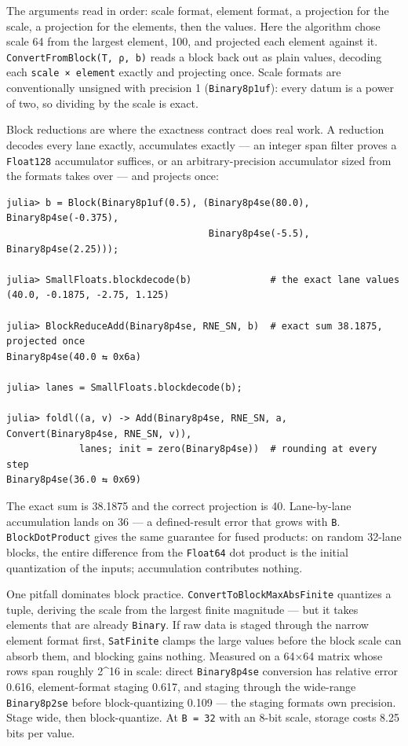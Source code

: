 The arguments read in order: scale format, element format, a projection for the scale, a projection for the elements, then the values. Here the algorithm chose scale 64 from the largest element, 100, and projected each element against it. \texttt{ConvertFromBlock(T, ρ, b)} reads a block back out as plain values, decoding each \texttt{scale × element} exactly and projecting once. Scale formats are conventionally unsigned with precision 1 (\texttt{Binary8p1uf}): every datum is a power of two, so dividing by the scale is exact.



Block reductions are where the exactness contract does real work. A reduction decodes every lane exactly, accumulates exactly — an integer span filter proves a \texttt{Float128} accumulator suffices, or an arbitrary-precision accumulator sized from the formats takes over — and projects once:




\begin{verbatim}
julia> b = Block(Binary8p1uf(0.5), (Binary8p4se(80.0), Binary8p4se(-0.375),
                                    Binary8p4se(-5.5), Binary8p4se(2.25)));

julia> SmallFloats.blockdecode(b)              # the exact lane values
(40.0, -0.1875, -2.75, 1.125)

julia> BlockReduceAdd(Binary8p4se, RNE_SN, b)  # exact sum 38.1875, projected once
Binary8p4se(40.0 ⇆ 0x6a)

julia> lanes = SmallFloats.blockdecode(b);

julia> foldl((a, v) -> Add(Binary8p4se, RNE_SN, a, Convert(Binary8p4se, RNE_SN, v)),
             lanes; init = zero(Binary8p4se))  # rounding at every step
Binary8p4se(36.0 ⇆ 0x69)
\end{verbatim}



The exact sum is 38.1875 and the correct projection is 40. Lane-by-lane accumulation lands on 36 — a defined-result error that grows with \texttt{B}. \texttt{BlockDotProduct} gives the same guarantee for fused products: on random 32-lane blocks, the entire difference from the \texttt{Float64} dot product is the initial quantization of the inputs; accumulation contributes nothing.



One pitfall dominates block practice. \texttt{ConvertToBlockMaxAbsFinite} quantizes a tuple, deriving the scale from the largest finite magnitude — but it takes elements that are already \texttt{Binary}. If raw data is staged through the narrow element format first, \texttt{SatFinite} clamps the large values before the block scale can absorb them, and blocking gains nothing. Measured on a 64×64 matrix whose rows span roughly 2{\textasciicircum}16 in scale: direct \texttt{Binary8p4se} conversion has relative error 0.616, element-format staging 0.617, and staging through the wide-range \texttt{Binary8p2se} before block-quantizing 0.109 — the staging format{\textquotesingle}s own precision. Stage wide, then block-quantize. At \texttt{B = 32} with an 8-bit scale, storage costs 8.25 bits per value.



